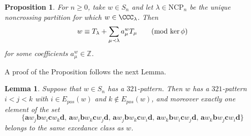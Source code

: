 \documentclass[12pt]{amsart}
\newtheorem{prop}[equation]{Proposition}
\newtheorem{lem}[equation]{Lemma}
\theoremstyle{definition}
\theoremstyle{remark}
\numberwithin{equation}{section}
\newcommand{\ZZ}{\mathbb{Z}}
\newcommand{\NCP}{\mathrm{NCP}}
\newcommand{\EP}{E_{pos}}
\begin{document}
\begin{prop}
\label{prop:TLbases}
For $n \ge 0$, take $w \in S_{n}$ and let $\lambda \in \NCP_{n}$ be the unique noncrossing partition for which $w \in \CCC_{\lambda}$.  Then
\[
w \equiv T_{\lambda} + \sum_{\mu \prec \lambda} a_{\mu}^{w} T_{\mu} \qquad \text{(mod $ \ker\phi$)}
\]
for some coefficients $a_{\mu}^{w} \in \ZZ$.
\end{prop}

A proof of the Proposition follows the next Lemma.

\begin{lem}
\label{lem:321excedance}
Suppose that $w \in S_{n}$ has a $321$-pattern.  Then $w$ has a $321$-pattern $i < j < k$ with $i \in \EP(w)$ and $k \notin \EP(w)$, and moreover exactly one element of the set 
\[
\{
\mathbf{a}w_{j}\mathbf{b}w_{i}\mathbf{c}w_{k}\mathbf{d},  \,
\mathbf{a}w_{i}\mathbf{b}w_{k}\mathbf{c}w_{j}\mathbf{d}, \,
\mathbf{a}w_{j}\mathbf{b}w_{k}\mathbf{c}w_{i}\mathbf{d}, \,
\mathbf{a}w_{k}\mathbf{b}w_{i}\mathbf{c}w_{j}\mathbf{d}, \,
\mathbf{a}w_{k}\mathbf{b}w_{j}\mathbf{c}w_{i}\mathbf{d}
\}
\]
belongs to the same excedance class as $w$.
\end{lem}
\end{document}
